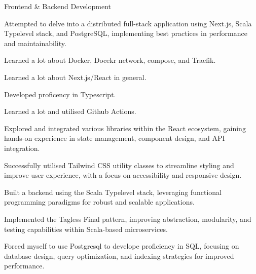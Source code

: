 
\begin{cventries}

  \cventry
    {Frontend \& Backend Development} %
    {} %
    {} %
    {} %
    {
      \begin{cvitems} %
        \item {Attempted to delve into a distributed full-stack application using Next.js, Scala Typelevel stack, and PostgreSQL, implementing best practices in performance and maintainability.}
        \item {Learned a lot about Docker, Docekr network, compose, and Traefik.}
        \item {Learned a lot about Next.js/React in general.}
        \item {Developed proficency in Typescript.}
        \item {Learned a lot and utilised Github Actions.}
        \item {Explored and integrated various libraries within the React ecosystem, gaining hands-on experience in state management, component design, and API integration.}
        \item {Successfully utilised Tailwind CSS utility classes to streamline styling and improve user experience, with a focus on accessibility and responsive design.}
        \item {Built a backend using the Scala Typelevel stack, leveraging functional programming paradigms for robust and scalable applications.}
        \item {Implemented the Tagless Final pattern, improving abstraction, modularity, and testing capabilities within Scala-based microservices.}
        \item {Forced myself to use Postgresql to develope proficiency in SQL, focusing on database design, query optimization, and indexing strategies for improved performance.}
      \end{cvitems}
    }


\end{cventries}
